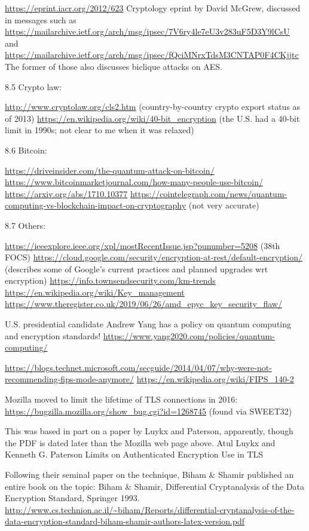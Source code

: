 \documentclass[%
 aip,
 jmp,%
 amsmath,amssymb,
 reprint,%
]{revtex4-1}
\begin{document}
\url{https://eprint.iacr.org/2012/623}
Cryptology eprint by David McGrew,
discussed in messages such as
\url{https://mailarchive.ietf.org/arch/msg/ipsec/7V6ry4le7eU3v283uF5D3Y9lCsU}
and
\url{https://mailarchive.ietf.org/arch/msg/ipsec/fQciMNrxTdsM3CNTAP0F4CKjjtc}
The former of those also discusses biclique attacks on AES.

8.5 Crypto law:

\url{http://www.cryptolaw.org/cls2.htm}
(country-by-country crypto export
status as of 2013)
\url{https://en.wikipedia.org/wiki/40-bit_encryption}
(the U.S. had a 40-bit
limit in 1990s; not clear to me when it was relaxed)

8.6 Bitcoin:

\url{https://driveinsider.com/the-quantum-attack-on-bitcoin/}
\url{https://www.bitcoinmarketjournal.com/how-many-people-use-bitcoin/}
\url{https://arxiv.org/abs/1710.10377}
\url{https://cointelegraph.com/news/quantum-computing-vs-blockchain-impact-on-cryptography}
(not very accurate)

8.7 Others:

\url{https://ieeexplore.ieee.org/xpl/mostRecentIssue.jsp?punumber=5208}
(38th FOCS)
\url{https://cloud.google.com/security/encryption-at-rest/default-encryption/}
(describes some of Google's current practices and planned upgrades wrt
encryption)
\url{https://info.townsendsecurity.com/km-trends}
\url{https://en.wikipedia.org/wiki/Key_management}
\url{https://www.theregister.co.uk/2019/06/26/amd_epyc_key_security_flaw/}

U.S. presidential candidate Andrew Yang has a policy on quantum
computing and encryption standards!
\url{https://www.yang2020.com/policies/quantum-computing/}

\url{https://blogs.technet.microsoft.com/secguide/2014/04/07/why-were-not-recommending-fips-mode-anymore/}
\url{https://en.wikipedia.org/wiki/FIPS_140-2}

Mozilla moved to limit the lifetime of TLS connections in 2016:
\url{https://bugzilla.mozilla.org/show_bug.cgi?id=1268745}
(found via SWEET32)

This was based in part on a paper by Luykx and Paterson, apparently,
though the PDF is dated later than the Mozilla web page above.
Atul Luykx and Kenneth G. Paterson
Limits on Authenticated Encryption Use in TLS

Following their seminal paper on the technique, Biham \& Shamir
published an entire book on the topic:
Biham \& Shamir, Differential Cryptanalysis of the Data Encryption
Standard, Springer 1993.
\url{http://www.cs.technion.ac.il/~biham/Reports/differential-cryptanalysis-of-the-data-encryption-standard-biham-shamir-authors-latex-version.pdf}
\end{document}

